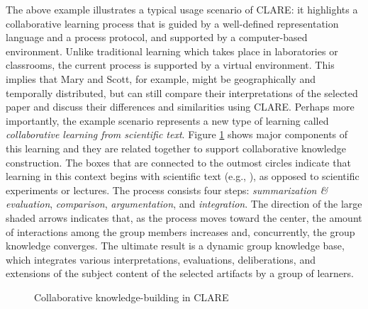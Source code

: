 The above example illustrates a typical usage scenario of CLARE: it
highlights a collaborative learning process that is guided by a
well-defined representation language and a process protocol, and supported
by a computer-based environment. Unlike traditional learning which takes
place in laboratories or classrooms, the current process is supported by a
virtual environment. This implies that Mary and Scott, for example, might
be geographically and temporally distributed, but can still compare their
interpretations of the selected paper and discuss their differences and
similarities using CLARE. Perhaps more importantly, the example scenario
represents a new type of learning called {\it collaborative learning from
scientific text}. Figure \ref{fig:learning-community} shows major
components of this learning and they are related together to support
collaborative knowledge construction. The boxes that are connected to the
outmost circles indicate that learning in this context begins with
scientific text (e.g., \cite{Kaplan92}), as opposed to scientific
experiments or lectures. The process consists four steps: {\it
summarization \& evaluation\/}, {\it comparison\/}, {\it argumentation\/},
and {\it integration\/}. The direction of the large shaded arrows indicates
that, as the process moves toward the center, the amount of interactions
among the group members increases and, concurrently, the group knowledge
converges. The ultimate result is a dynamic group knowledge base, which
integrates various interpretations, evaluations, deliberations, and
extensions of the subject content of the selected artifacts by a group of
learners.


\begin{figure}[htb]
  \caption{Collaborative knowledge-building in CLARE}
  \label{fig:learning-community}
\end{figure}

